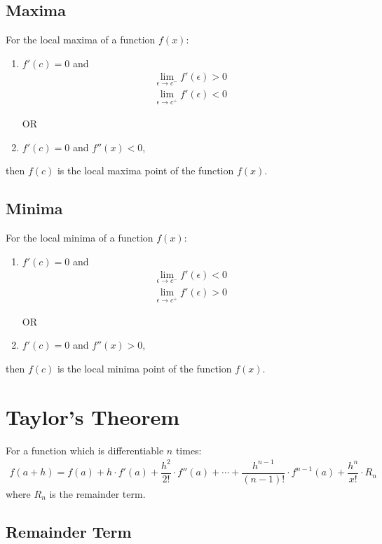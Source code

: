 \documentclass[../main.tex]{subfile}
\begin{document}
    \subsection{Maxima}
    For the local maxima of a function $f(x)$:
    \begin{enumerate}
        \item $f'(c)=0$ and
        \begin{align}
        \lim_{\epsilon\to c^{-}} f'(\epsilon)>0\nonumber\\
        \lim_{\epsilon\to c^{+}} f'(\epsilon)<0\nonumber
        \end{align}
    \begin{center}
    OR
    \end{center}
        \item $f'(c)=0$ and $f''(x)<0$,
    \end{enumerate}
    then $f(c)$ is the local maxima point of the function $f(x)$.

    \subsection{Minima}
    For the local minima of a function $f(x)$:
    \begin{enumerate}
        \item $f'(c)=0$ and
    \begin{align}
        \lim_{\epsilon\to c^{-}} f'(\epsilon)<0\nonumber\\
        \lim_{\epsilon\to c^{+}} f'(\epsilon)>0\nonumber
    \end{align}
    \begin{center}
    OR
    \end{center}
        \item $f'(c)=0$ and $f''(x)>0$,
    \end{enumerate}
    then $f(c)$ is the local minima point of the function $f(x)$.

    \section{Taylor's Theorem}
    For a function which is differentiable $n$ times:
    \begin{align}
            f(a + h) = f(a) + h \cdot f'(a) + \dfrac{h^2}{2!} \cdot f''(a) + \cdots + \dfrac{h^{n-1}}{(n-1)!} \cdot f^{n - 1}(a) + \dfrac{h^n}{x!} \cdot R_n
    \end{align}
    where $R_n$ is the remainder term.
    \subsection{Remainder Term}
\end{document}
